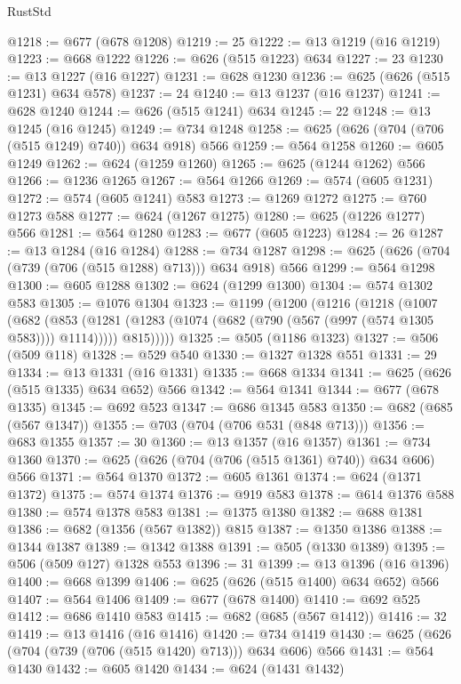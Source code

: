\begin{lexlean}{RustStd}
\begin{coremodule}
@1218 := @677 (@678 @1208)
@1219 := 25
@1222 := @13 @1219 (@16 @1219)
@1223 := @668 @1222
@1226 := @626 (@515 @1223) @634
@1227 := 23
@1230 := @13 @1227 (@16 @1227)
@1231 := @628 @1230
@1236 := @625 (@626 (@515 @1231) @634 @578)
@1237 := 24
@1240 := @13 @1237 (@16 @1237)
@1241 := @628 @1240
@1244 := @626 (@515 @1241) @634
@1245 := 22
@1248 := @13 @1245 (@16 @1245)
@1249 := @734 @1248
@1258 := @625 (@626 (@704 (@706 (@515 @1249) @740)) @634 @918) @566
@1259 := @564 @1258
@1260 := @605 @1249
@1262 := @624 (@1259 @1260)
@1265 := @625 (@1244 @1262) @566
@1266 := @1236 @1265
@1267 := @564 @1266
@1269 := @574 (@605 @1231)
@1272 := @574 (@605 @1241) @583
@1273 := @1269 @1272
@1275 := @760 @1273 @588
@1277 := @624 (@1267 @1275)
@1280 := @625 (@1226 @1277) @566
@1281 := @564 @1280
@1283 := @677 (@605 @1223)
@1284 := 26
@1287 := @13 @1284 (@16 @1284)
@1288 := @734 @1287
@1298 := @625 (@626 (@704 (@739 (@706 (@515 @1288) @713))) @634 @918) @566
@1299 := @564 @1298
@1300 := @605 @1288
@1302 := @624 (@1299 @1300)
@1304 := @574 @1302 @583
@1305 := @1076 @1304
@1323 := @1199
    (@1200
      (@1216
        (@1218
          (@1007
            (@682
              (@853 (@1281 (@1283 (@1074 (@682 (@790 (@567 (@997 (@574 @1305 @583)))) @1114)))))
              @815)))))
@1325 := @505 (@1186 @1323)
@1327 := @506 (@509 @118)
@1328 := @529 @540
@1330 := @1327 @1328 @551
@1331 := 29
@1334 := @13 @1331 (@16 @1331)
@1335 := @668 @1334
@1341 := @625 (@626 (@515 @1335) @634 @652) @566
@1342 := @564 @1341
@1344 := @677 (@678 @1335)
@1345 := @692 @523
@1347 := @686 @1345 @583
@1350 := @682 (@685 (@567 @1347))
@1355 := @703 (@704 (@706 @531 (@848 @713)))
@1356 := @683 @1355
@1357 := 30
@1360 := @13 @1357 (@16 @1357)
@1361 := @734 @1360
@1370 := @625 (@626 (@704 (@706 (@515 @1361) @740)) @634 @606) @566
@1371 := @564 @1370
@1372 := @605 @1361
@1374 := @624 (@1371 @1372)
@1375 := @574 @1374
@1376 := @919 @583
@1378 := @614 @1376 @588
@1380 := @574 @1378 @583
@1381 := @1375 @1380
@1382 := @688 @1381
@1386 := @682 (@1356 (@567 @1382)) @815
@1387 := @1350 @1386
@1388 := @1344 @1387
@1389 := @1342 @1388
@1391 := @505 (@1330 @1389)
@1395 := @506 (@509 @127) @1328 @553
@1396 := 31
@1399 := @13 @1396 (@16 @1396)
@1400 := @668 @1399
@1406 := @625 (@626 (@515 @1400) @634 @652) @566
@1407 := @564 @1406
@1409 := @677 (@678 @1400)
@1410 := @692 @525
@1412 := @686 @1410 @583
@1415 := @682 (@685 (@567 @1412))
@1416 := 32
@1419 := @13 @1416 (@16 @1416)
@1420 := @734 @1419
@1430 := @625 (@626 (@704 (@739 (@706 (@515 @1420) @713))) @634 @606) @566
@1431 := @564 @1430
@1432 := @605 @1420
@1434 := @624 (@1431 @1432)

\end{coremodule}
\end{lexlean}
